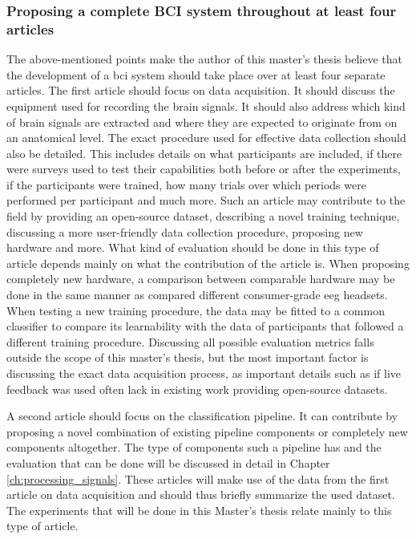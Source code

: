 
\subsubsection{Proposing a complete BCI system throughout at least four articles}
\label{subsubsec:bci_opportunities_obstacles_lack_of_testing_four_articles}

The above-mentioned points make the author of this master's thesis believe that the development of a \gls{bci} system should take place over at least four separate articles.
The first article should focus on data acquisition.
It should discuss the equipment used for recording the brain signals.
It should also address which kind of brain signals are extracted and where they are expected to originate from on an anatomical level.
The exact procedure used for effective data collection should also be detailed.
This includes details on what participants are included, if there were surveys used to test their capabilities both before or after the experiments, if the participants were trained, how many trials over which periods were performed per participant and much more. 
Such an article may contribute to the field by providing an open-source dataset, describing a novel training technique, discussing a more user-friendly data collection procedure, proposing new hardware and more.
What kind of evaluation should be done in this type of article depends mainly on what the contribution of the article is.
When proposing completely new hardware, a comparison between comparable hardware may be done in the same manner as \citet{compare_eeg_devices_for_ssvep} compared different consumer-grade \gls{eeg} headsets.
When testing a new training procedure, the data may be fitted to a common classifier to compare its learnability with the data of participants that followed a different training procedure. 
Discussing all possible evaluation metrics falls outside the scope of this master's thesis, but the most important factor is discussing the exact data acquisition process, as important details such as if live feedback was used often lack in existing work providing open-source datasets.

A second article should focus on the classification pipeline.
It can contribute by proposing a novel combination of existing pipeline components or completely new components altogether.
The type of components such a pipeline has and the evaluation that can be done will be discussed in detail in Chapter \ref{ch:processing_signals}.
These articles will make use of the data from the first article on data acquisition and should thus briefly summarize the used dataset.
The experiments that will be done in this Master's thesis relate mainly to this type of article.

